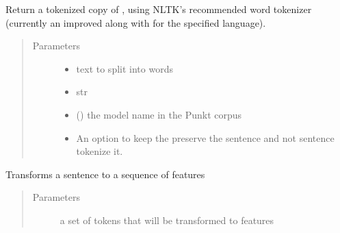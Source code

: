 \documentclass[letterpaper,10pt,english]{sphinxmanual}
\begin{document}
\begin{fulllineitems}
\begin{fulllineitems}
\label{\detokenize{index:ner_plugins.NER_CRF.NER_CRF.custom_word_tokenize}}
Return a tokenized copy of ,
using NLTK’s recommended word tokenizer
(currently an improved 
along with 
for the specified language).
\begin{quote}\begin{description}
\item[{Parameters}] \leavevmode\begin{itemize}
\item {} 
 \textendash{} text to split into words

\item {} 
 \textendash{} str

\item {} 
 () \textendash{} the model name in the Punkt corpus

\item {} 
 \textendash{} An option to keep the preserve the sentence and not sentence tokenize it.

\end{itemize}

\end{description}\end{quote}

\end{fulllineitems}


\begin{fulllineitems}
\label{\detokenize{index:ner_plugins.NER_CRF.NER_CRF.doc2features}}
Transforms a sentence to a sequence of features
\begin{quote}\begin{description}
\item[{Parameters}] \leavevmode
{} \textendash{} a set of tokens that will be transformed to features


\end{description}
\end{quote}
\end{fulllineitems}
\end{fulllineitems}
\end{document}
